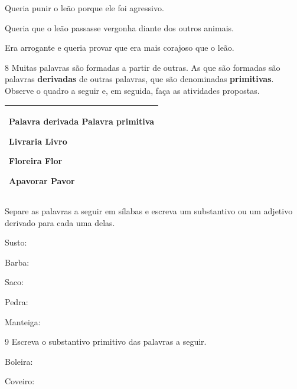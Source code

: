 \begin{boxlist}
\boxitem[] Queria punir o leão porque ele foi agressivo.

\boxitem[] Queria que o leão passasse vergonha diante dos outros animais.

\boxitem[X] Era arrogante e queria provar que era mais corajoso que o leão.

\num{8} Muitas palavras são formadas a partir de outras. As que são formadas são
palavras \textbf{derivadas} de outras palavras, que são denominadas
\textbf{primitivas}. Observe o quadro a seguir e, em seguida, faça as
atividades propostas.

\begin{longtable}[]{@{}l@{}}
\toprule
\begin{minipage}[t]{0.97\columnwidth}\raggedright\strut
\textbf{Palavra derivada Palavra primitiva}

Livraria Livro

Floreira Flor

Apavorar Pavor\strut
\end{minipage}\tabularnewline
\bottomrule
\end{longtable}

Separe as palavras a seguir em sílabas e escreva um substantivo ou um
adjetivo derivado para cada uma delas.

\begin{escolha}
\item Susto: 

\item
  Barba: 

\item
  Saco: 

\item
  Pedra: 

\item
  Manteiga: 
\end{escolha}

\num{9} Escreva o substantivo primitivo das palavras a seguir.

\begin{escolha}
\item Boleira: 

\item Coveiro: 


\end{escolha}
\end{boxlist}
